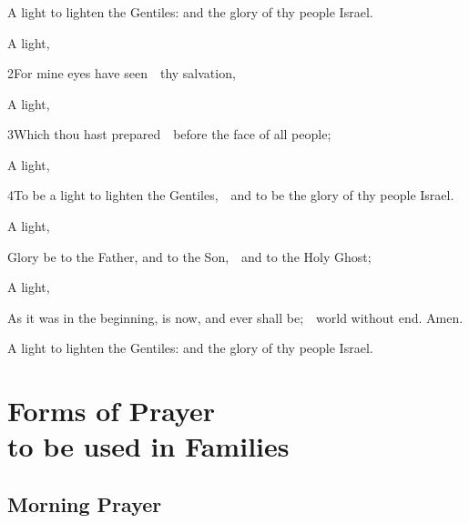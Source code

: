

\subsection{}

 A light to lighten the Gentiles: and the glory of thy people Israel.


\ant A light, \etc

2\enspace For mine eyes have seen\ \star\ thy salvation,

\ant A light, \etc

3\enspace  Which thou hast prepared\ \star\ before the face of all people;

\ant A light, \etc

4\enspace  To be a light to lighten the Gentiles,\ \star\ and to be the glory of thy people Israel.

\ant A light, \etc

Glory be to the Father, and to the Son,\ \star\ and to the Holy Ghost;

\ant A light, \etc

As it was in the beginning, is now, and ever shall be;\ \star\ world without end. Amen.

 A light to lighten the Gentiles: and the glory of thy people Israel.




\fleuron
\newpage



\chapter[Family Prayer]{Forms of Prayer\\to be used in Families}


\section{Morning Prayer}


